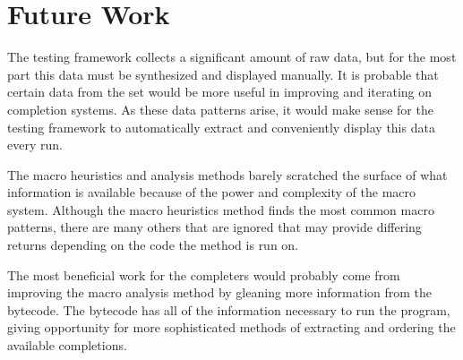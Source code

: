 \documentclass[ms,electronic,twosidetoc,letterpaper,chaptercenter,parttop,lol,lof,lot]{byumsphd}
\begin{document}
\section{Future Work}

The testing framework collects a significant amount of raw data, but for the most part this data must be synthesized and displayed manually.
It is probable that certain data from the set would be more useful in improving and iterating on completion systems.
As these data patterns arise, it would make sense for the testing framework to automatically extract and conveniently display this data every run.

The macro heuristics and analysis methods barely scratched the surface of what information is available because of the power and complexity of the macro system.
Although the macro heuristics method finds the most common macro patterns, there are many others that are ignored that may provide differing returns depending on the code the method is run on.

The most beneficial work for the completers would probably come from improving the macro analysis method by gleaning more information from the bytecode.
The bytecode has all of the information necessary to run the program, giving opportunity for more sophisticated methods of extracting and ordering the available completions.



\end{document}
